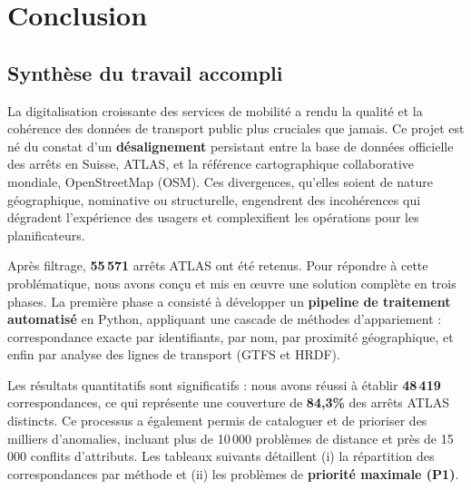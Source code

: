 \chapter*{Conclusion}


\section*{Synthèse du travail accompli}

La digitalisation croissante des services de mobilité a rendu la qualité et la cohérence des données de transport public plus cruciales que jamais. Ce projet est né du constat d'un \textbf{désalignement} persistant entre la base de données officielle des arrêts en Suisse, ATLAS, et la référence cartographique collaborative mondiale, OpenStreetMap (OSM). Ces divergences, qu'elles soient de nature géographique, nominative ou structurelle, engendrent des incohérences qui dégradent l'expérience des usagers et complexifient les opérations pour les planificateurs.

Après filtrage, \textbf{55\,571} arrêts ATLAS ont été retenus. 
Pour répondre à cette problématique, nous avons conçu et mis en œuvre une solution complète en trois phases. La première phase a consisté à développer un \textbf{pipeline de traitement automatisé} en Python, appliquant une cascade de méthodes d'appariement : correspondance exacte par identifiants, par nom, par proximité géographique, et enfin par analyse des lignes de transport (GTFS et HRDF). 

Les résultats quantitatifs sont significatifs : nous avons réussi à établir \textbf{48\,419} correspondances, ce qui représente une couverture de \textbf{84,3\%} des arrêts ATLAS distincts. Ce processus a également permis de cataloguer et de prioriser des milliers d'anomalies, incluant plus de 10\,000 problèmes de distance et près de 15\,000 conflits d'attributs. Les tableaux suivants détaillent (i) la répartition des correspondances par méthode et (ii) les problèmes de \textbf{priorité maximale (P1)}.

\vspace{0.5em}
